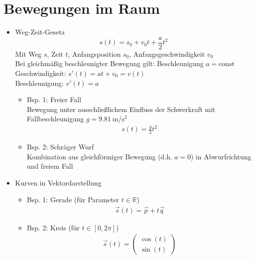 \documentclass[a4paper, 12pt, onecolumn]{scrartcl}
\begin{document}
\section*{Bewegungen im Raum}

  \begin{itemize}
    \item Weg-Zeit-Gesetz \\
  \begin{equation}
    s (t) = s_0 + v_0 t + \frac{a}{2} t^2
  \end{equation}
    Mit Weg $s$, Zeit $t$, Anfangsposition $s_0$, Anfangsgeschwindigkeit $v_0$\\
    Bei gleichmäßig beschleunigter Bewegung gilt: Beschleunigung $a = \text{const}$ \\
    Geschwindigkeit: $s' (t) = a t + v_0 = v (t)$\\
    Beschleunigung:  $v' (t) = a$
    
    \begin{itemize}
      \item Bsp. 1: Freier Fall \\
        Bewegung unter ausschließlichem Einfluss der Schwerkraft mit Fallbeschleunigung 
        $g = \SI{9.81}{\meter\per\square\second}$
      \begin{align}
        s (t) = \frac{g}{2} t^2
      \end{align}

      \item Bsp. 2: Schräger Wurf \\
        Kombination aus gleichförmiger Bewegung (d.h. $a = 0$) in Abwurfrichtung und freiem Fall
    \end{itemize}

  \item Kurven in Vektordarstellung

    \begin{itemize}
        \item Bsp. 1: Gerade (für Parameter $t \in \mathbb{R}$)\\
      \begin{align}
        \vec{s} (t) = \vec{p} + t \vec{q}
      \end{align}
        \item Bsp. 2: Kreis (für $t \in [0, 2\pi]$)\\
      \begin{align}
        \vec{s} (t) = \left( \begin{matrix} \cos (t) \\ \sin (t) \end{matrix} \right)
      \end{align}
    

\end{itemize}
\end{itemize}
\end{document}
